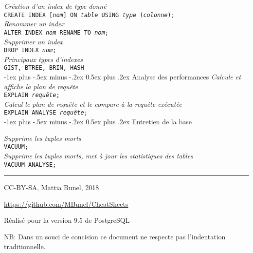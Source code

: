 \documentclass[10pt,landscape, a4paper]{article}
\makeatletter
\renewcommand{\section}{\@startsection{section}{1}{0mm}%
                                {-1ex plus -.5ex minus -.2ex}%
                                {0.5ex plus .2ex}%
                                {\normalfont\large\bfseries}}
\makeatother
\begin{document}
\begin{multicols}{3}
  \hspace{0.25em} {\scriptsize \emph{Création d'un index de type donné}} \\
 \texttt{CREATE INDEX [\emph{nom}] ON \emph{table} USING \emph{type} (\emph{colonne});}\\

  \hspace{0.25em} {\scriptsize \emph{Renommer un index}} \\
 \texttt{ALTER INDEX \emph{nom} RENAME  TO \emph{nom};}\\

  \hspace{0.25em} {\scriptsize \emph{Supprimer un index}} \\
 \texttt{DROP INDEX \emph{nom};}\\

  \hspace{0.25em} {\scriptsize \emph{Principaux types d'indexes}} \\
 \texttt{GIST, BTREE, BRIN, HASH}\\

\section{Analyse des performances}
  \hspace{0.25em} {\scriptsize \emph{Calcule et affiche la plan de requête}} \\
 \texttt{EXPLAIN \emph{requête};}\\

  \hspace{0.25em} {\scriptsize \emph{Calcul le plan de requête et le compare à la requête exécutée}} \\
 \texttt{EXPLAIN ANALYSE \emph{requête};}\\

\section{Entretien de la base}

  \hspace{0.25em} {\scriptsize \emph{Supprime les tuples morts}} \\
 \texttt{VACUUM;}\\

  \hspace{0.25em} {\scriptsize \emph{Supprime les tuples morts, met à jour les statistiques des tables}} \\
 \texttt{VACUUM ANALYSE;}\\

\rule{0.3\linewidth}{0.25pt}
\scriptsize
CC-BY-SA, Mattia Bunel, 2018

\href{https://github.com/MBunel/CheatSheets}{https://github.com/MBunel/CheatSheets}

Réalisé pour la version 9.5 de PostgreSQL

NB: Dans un souci de concision ce document ne respecte pas l'indentation traditionnelle. 

\end{multicols}
\end{document}
